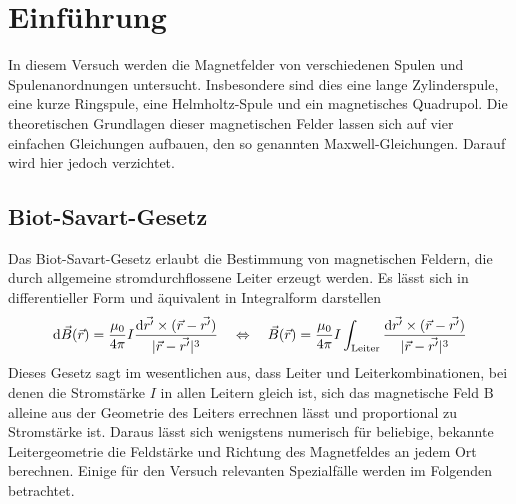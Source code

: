\section{Einführung}
In diesem Versuch werden die Magnetfelder von verschiedenen Spulen und Spulenanordnungen untersucht. Insbesondere sind dies eine lange Zylinderspule, eine kurze Ringspule, eine Helmholtz-Spule und ein magnetisches Quadrupol. Die theoretischen Grundlagen dieser magnetischen Felder lassen sich auf vier einfachen Gleichungen aufbauen, den so genannten Maxwell-Gleichungen. Darauf wird hier jedoch verzichtet.
\subsection{Biot-Savart-Gesetz}
Das Biot-Savart-Gesetz erlaubt die Bestimmung von magnetischen Feldern, die durch allgemeine stromdurchflossene Leiter erzeugt werden. Es lässt sich in differentieller Form und äquivalent in Integralform darstellen
\begin{equation}
	\mathrm{d} \vec{B}(\vec{r}) = \frac{\mu_0}{4\pi} I \frac{\mathrm{d}\vec{r'}\times (\vec{r} - \vec{r'})}{|\vec{r} - \vec{r'}|^3} \quad \Leftrightarrow \quad 
	\vec{B}(\vec{r}) = \frac{\mu_0}{4\pi} I \int\nolimits_{\text{Leiter}} \frac{\mathrm{d}\vec{r'}\times (\vec{r} - \vec{r'})}{|\vec{r} - \vec{r'}|^3}
\end{equation}
Dieses Gesetz sagt im wesentlichen aus, dass Leiter und Leiterkombinationen, bei denen die Stromstärke $ I $ in allen Leitern gleich ist, sich das magnetische Feld $ \mathrm{B} $ alleine aus der Geometrie des Leiters errechnen lässt und proportional zu Stromstärke ist.
Daraus lässt sich wenigstens numerisch für beliebige, bekannte Leitergeometrie die Feldstärke und Richtung des Magnetfeldes an jedem Ort berechnen. Einige für den Versuch relevanten Spezialfälle werden im Folgenden betrachtet.

